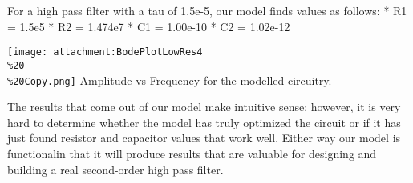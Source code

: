 \documentclass[11pt]{article}
\makeatletter
\def\maxwidth{\ifdim\Gin@nat@width>\linewidth\linewidth
    \else\Gin@nat@width\fi}
\let\Oldincludegraphics\includegraphics
\renewcommand{\includegraphics}[1]{\Oldincludegraphics[width=.8\maxwidth]{#1}}
\makeatother
\begin{document}
For a high pass filter with a tau of 1.5e-5, our model finds values as
follows: * R1 = 1.5e5 * R2 = 1.474e7 * C1 = 1.00e-10 * C2 = 1.02e-12

\texttt{[image: attachment:BodePlotLowRes4\\\%20-\\\%20Copy.png]} Amplitude
vs Frequency for the modelled circuitry.

The results that come out of our model make intuitive sense; however, it
is very hard to determine whether the model has truly optimized the
circuit or if it has just found resistor and capacitor values that work
well. Either way our model is functionalin that it will produce results
that are valuable for designing and building a real second-order high
pass filter.


    
    
    
    
\end{document}
